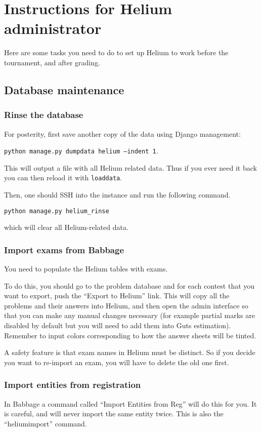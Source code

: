 \chapter{Instructions for Helium administrator}
Here are some tasks you need to do to set up Helium
to work before the tournament, and after grading.

\section{Database maintenance}
\subsection{Rinse the database}
For posterity, first save another copy of the data using Django management:
\begin{center}
	\texttt{python manage.py dumpdata helium --indent 1}.
\end{center}
This will output a file with all Helium related data.
Thus if you ever need it back you can then reload it with \texttt{loaddata}.

Then, one should SSH into the instance and run the following command.
\begin{center}
	\texttt{python manage.py helium\_rinse}
\end{center}
which will clear all Helium-related data.

\subsection{Import exams from Babbage}
You need to populate the Helium tables with exams.

To do this, you should go to the problem database and for each contest
that you want to export, push the ``Export to Helium'' link.
This will copy all the problems and their answers into Helium,
and then open the admin interface
so that you can make any manual changes necessary
(for example partial marks are disabled by default
but you will need to add them into Guts estimation).
Remember to input colors corresponding to how the answer sheets will be tinted.

A safety feature is that exam names in Helium must be distinct.
So if you decide you want to re-import an exam,
you will have to delete the old one first.

\subsection{Import entities from registration}
In Babbage a command called ``Import Entities from Reg'' will do this for you.
It is careful, and will never import the same entity twice.
This is also the ``heliumimport'' command.

